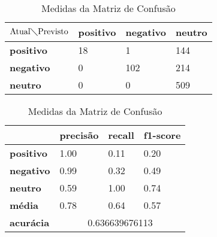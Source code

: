 \begin{table}[h!]
\centering
\begin{minipage}[b]{0.45\linewidth}
\caption{Matriz de Confusão Ternário: \textit{Naive Bayes}}
\label{tab:mcb-nb}
\begin{tabular}{|l|l|l|l|}
\hline
$\textrm{Atual}\diagdown\textrm{Previsto}$ & \textbf{positivo} & \textbf{negativo} & \textbf{neutro}\\ \hline
\textbf{positivo} & 18 & 1 & 144\\ \hline
\textbf{negativo} & 0 & 102 & 214\\ \hline
\textbf{neutro} & 0 & 0 & 509\\ \hline
\end{tabular}
\end{minipage}
\hspace{0.5cm}
\begin{minipage}[b]{0.45\linewidth}

\centering
\caption{Medidas da Matriz de Confusão}
\label{tab:mmcb-nb}
\begin{tabular}{|l|l|l|l|}
\hline
         & \textbf{precisão} & \textbf{recall} & \textbf{f1-score} \\ \hline
\textbf{positivo} & 1.00     & 0.11   & 0.20     \\ \hline
\textbf{negativo} & 0.99     & 0.32   & 0.49     \\ \hline
\textbf{neutro} & 0.59     & 1.00   & 0.74     \\ \hline
\textbf{média} & 0.78     & 0.64   & 0.57     \\ \hline
\textbf{acurácia} & \multicolumn{3}{|c|}{0.636639676113}\\ \hline
\end{tabular}
\end{minipage}
\end{table}

